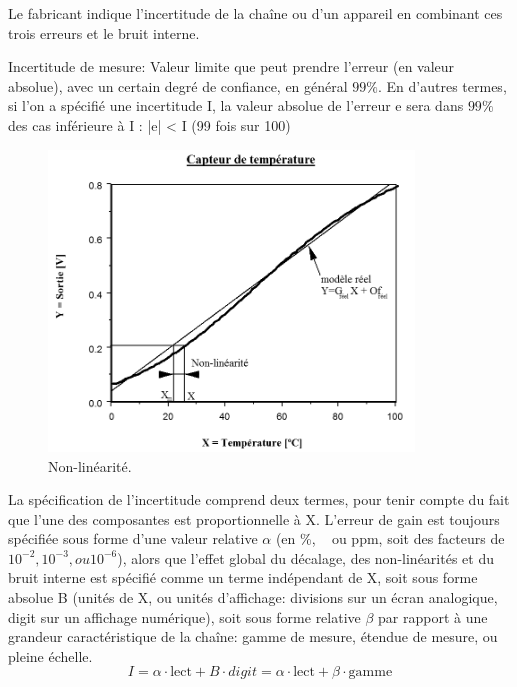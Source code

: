 \documentclass[main.tex]{subfiles}
\begin{document}
Le fabricant indique l'incertitude de la chaîne ou d'un appareil en combinant ces trois erreurs et le bruit interne.

\begin{definition}
	Incertitude de mesure: Valeur limite que peut prendre l'erreur (en valeur absolue), avec un certain degré de confiance, en général $99 \%$. En d'autres termes, si l'on a spécifié une incertitude I, la valeur absolue de l'erreur e sera dans $99 \%$ des cas inférieure à I : 	|e| < I 	(99 fois sur 100)
\end{definition}

\begin{figure}
    \centering
    \includegraphics[height=8cm]{assets/figures/3_1_Non_Linearite.PNG}
    \caption{Non-linéarité.}
    \label{fig:Non-linearite}
\end{figure}
La spécification de l'incertitude comprend deux termes, pour tenir compte du fait que l'une des composantes est proportionnelle à X. L'erreur de gain est toujours spécifiée sous forme d'une valeur relative $\alpha$ (en \%, \textperthousand ~ ou ppm, soit des facteurs de $10^{-2}, 10^{-3}, ou 10^{-6}$), alors que l'effet global du décalage, des non-linéarités et du bruit interne est spécifié comme un terme indépendant de X, soit sous forme absolue B (unités de X, ou unités d'affichage: divisions sur un écran analogique, digit sur un affichage numérique), soit sous forme relative $\beta$ par rapport à une grandeur caractéristique de la chaîne: gamme de mesure, étendue de mesure, ou pleine échelle.
\begin{equation}
    I = \alpha \cdot \text{lect} + B \cdot digit = \alpha \cdot \text{lect} + \beta \cdot \text{gamme}
\end{equation}
\end{document}
